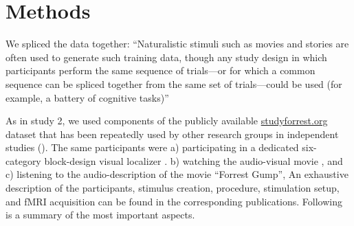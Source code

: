\section{Methods}






We spliced the data together: ``Naturalistic stimuli such as movies and stories
are often used to generate such training data, though any study design in which
participants perform the same sequence of trials—or for which a common sequence
can be spliced together from the same set of trials—could be used (for example,
a battery of cognitive tasks)'' \citep{cohen2017computational}

As in study 2, we
%
used components of the publicly available
\href{http://www.studyforrest.org}{studyforrest.org} dataset that has been
repeatedly used by other research groups in independent studies
(\citep[e.g.,][]{ben2018hippocampal, jiahui2020predicting, hu2017decoding,
lettieri2019emotionotopy, nguyen2016integration}).
The same participants were
a) participating in a dedicated six-category block-design visual localizer
\citep{sengupta2016extension}.
b) watching the audio-visual movie \citep{hanke2016simultaneous}, and
c) listening to the audio-description \citep{hanke2014audiomovie} of the movie
``Forrest Gump'',
An exhaustive description of the participants, stimulus creation, procedure,
stimulation setup, and fMRI acquisition can be found in the corresponding
publications. Following is a summary of the most important aspects.


